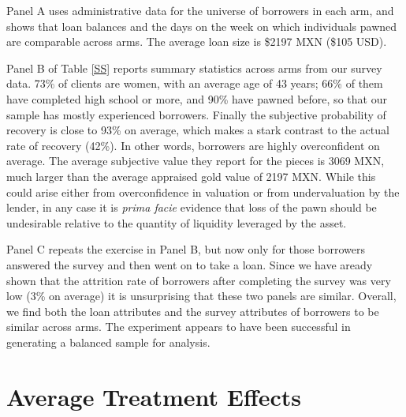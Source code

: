 \documentclass[oneside,11pt]{article}
\begin{document}
Panel A uses administrative data for the universe of borrowers in each arm, and shows that loan balances and the days on the week on which individuals pawned are comparable across arms.  The average loan size is \$2197 MXN (\$105 USD).


Panel B of Table \ref{SS} reports summary statistics across arms from our survey data. 73\% of clients are women, with an average age of 43 years; 66\% of them have completed high school or more, and 90\% have pawned before, so that our sample has mostly experienced borrowers. Finally the subjective probability of recovery is close to 93\% on average, which makes a stark contrast to the actual rate of recovery (42\%).  In other words, borrowers are highly overconfident on average. The average subjective value they report for the pieces is 3069 MXN, much larger than the average appraised gold value of 2197 MXN.  While this could arise either from overconfidence in valuation or from undervaluation by the lender, in any case it is \textit{prima facie} evidence that loss of the pawn should be undesirable relative to the quantity of liquidity leveraged by the asset. 

Panel C repeats the exercise in Panel B, but now only for those borrowers answered the survey and then went on to take a loan.  Since we have aready shown that the attrition rate of borrowers after completing the survey was very low (3\% on average) it is unsurprising that these two panels are similar.  Overall, we find both the loan attributes and the survey attributes of borrowers to be similar across arms.  The experiment appears to have been successful in generating a balanced sample for analysis.






 


\section{Average Treatment Effects} \label{experiment}
\end{document}
